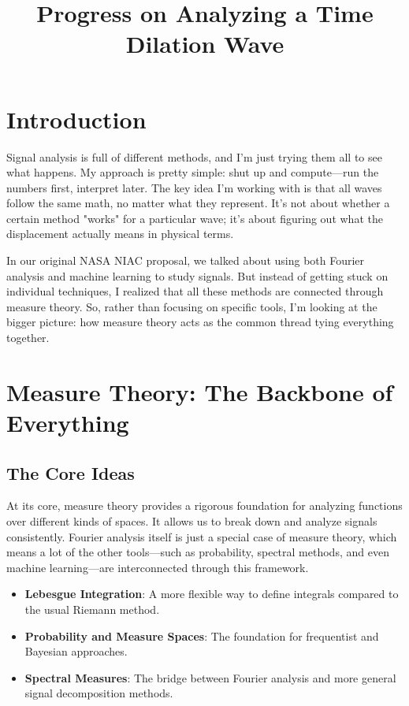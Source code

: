\documentclass{article}
\title{\textbf{Progress on Analyzing a Time Dilation Wave}}
\author{}
\date{}
\begin{document}
\maketitle

\section{Introduction}

Signal analysis is full of different methods, and I’m just trying them all to see what happens. My approach is pretty simple: shut up and compute—run the numbers first, interpret later. The key idea I’m working with is that all waves follow the same math, no matter what they represent. It’s not about whether a certain method "works" for a particular wave; it's about figuring out what the displacement actually means in physical terms.

In our original NASA NIAC proposal, we talked about using both Fourier analysis and machine learning to study signals. But instead of getting stuck on individual techniques, I realized that all these methods are connected through measure theory. So, rather than focusing on specific tools, I’m looking at the bigger picture: how measure theory acts as the common thread tying everything together.

\section{Measure Theory: The Backbone of Everything}

\subsection{The Core Ideas}

At its core, measure theory provides a rigorous foundation for analyzing functions over different kinds of spaces. It allows us to break down and analyze signals consistently. Fourier analysis itself is just a special case of measure theory, which means a lot of the other tools—such as probability, spectral methods, and even machine learning—are interconnected through this framework.

\begin{itemize}
    \item \textbf{Lebesgue Integration}: A more flexible way to define integrals compared to the usual Riemann method.
    \item \textbf{Probability and Measure Spaces}: The foundation for frequentist and Bayesian approaches.
    \item \textbf{Spectral Measures}: The bridge between Fourier analysis and more general signal decomposition methods.
\end{itemize}
\end{document}
